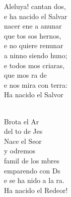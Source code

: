 \documentclass[12pt]{article}
\begin{document}
\begin{multicols*}{2}
\begin{cancion}
	Aleluya! cantan dos,\\
	e ha nacido el Salvar  \\
\jump
	 nacer ene a anunar\\
	que tos sos hernos,\\
	e no quiere renunar\\
	a ninno siendo huno; \\
	e todos mos criaras, \\
	que mos ra de   \\
	e nos mira con terra:\\
	Ha nacido el Salvor  \\\jump\\
	\begin{chorus}%
	Brota el Ar \\
	del to de Jes\\
	Nace el Seor \\
	y odremos \\
	 famil de los mbres  \\
	 emparendo con Ds  \\
	e se ha nido a la ra.\\
	Ha nacido el Redeor!\\
	\end{chorus}%
	\jump\\
	      \\
\end{cancion}%


\end{multicols*}
\end{document}
